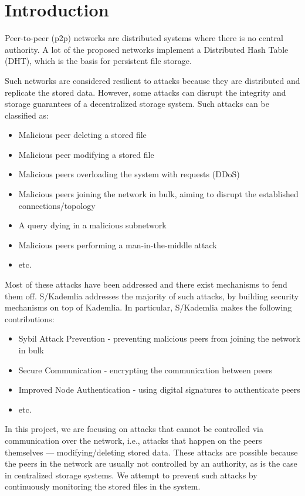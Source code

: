\chapter{Introduction}
\label{chap:introduction}

Peer-to-peer (p2p) networks are distributed systems where there is no central authority.
A lot of the proposed networks implement a Distributed Hash Table (DHT), which is the basis for persistent file storage.

Such networks are considered resilient to attacks
because they are distributed and replicate the stored data.
However, some attacks can disrupt the integrity and
storage guarantees of a decentralized storage system.
Such attacks can be classified as:
\begin{itemize}
    \item Malicious peer deleting a stored file
    \item Malicious peer modifying a stored file
    \item Malicious peers overloading the system with requests (DDoS)
    \item Malicious peers joining the network in bulk, aiming to disrupt the established connections/topology
    \item A query dying in a malicious subnetwork
    \item Malicious peers performing a man-in-the-middle attack
    \item etc.
\end{itemize}

Most of these attacks have been addressed and there exist mechanisms to fend them off.
S/Kademlia\cite{skademlia} addresses the majority of such attacks, by building security mechanisms on top of Kademlia\cite{kademlia}.
In particular, S/Kademlia makes the following contributions:
\begin{itemize}
    \item Sybil Attack Prevention - preventing malicious peers from joining the network in bulk
    \item Secure Communication - encrypting the communication between peers
    \item Improved Node Authentication - using digital signatures to authenticate peers
    \item etc.
\end{itemize}

In this project, we are focusing on attacks that cannot be controlled via communication over the network, i.e., attacks that happen on the peers themselves — modifying/deleting stored data.
These attacks are possible because the peers in the network are usually not controlled by an authority, as is the case in centralized storage systems.
We attempt to prevent such attacks by continuously monitoring the stored files in the system.

